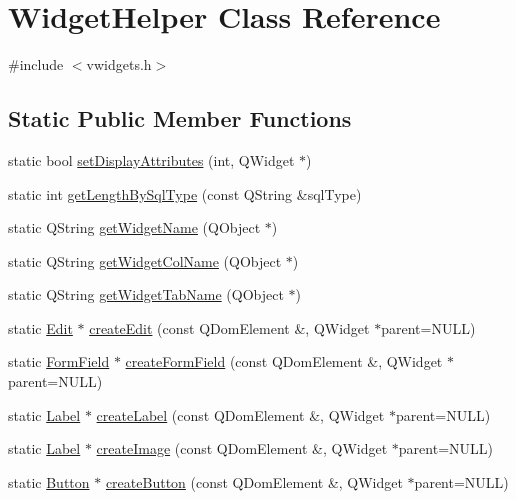 \hypertarget{classWidgetHelper}{
\section{WidgetHelper Class Reference}
\label{classWidgetHelper}
}


{\ttfamily \#include $<$vwidgets.h$>$}

\subsection*{Static Public Member Functions}
\begin{DoxyCompactItemize}
\item 
static bool \hyperlink{classWidgetHelper_aabfcae96d26b2f06c6b54415fafd126a}{setDisplayAttributes} (int, QWidget $\ast$)
\item 
static int \hyperlink{classWidgetHelper_a44924edd75dd3550e891d36e4239c3b5}{getLengthBySqlType} (const QString \&sqlType)
\item 
static QString \hyperlink{classWidgetHelper_ab262e7771ed7559e29f96b84f30fa060}{getWidgetName} (QObject $\ast$)
\item 
static QString \hyperlink{classWidgetHelper_a5b84bc03a940b50ce9adbf8aa743d050}{getWidgetColName} (QObject $\ast$)
\item 
static QString \hyperlink{classWidgetHelper_ac17838da3e6d0857231e428c0a24b18d}{getWidgetTabName} (QObject $\ast$)
\item 
static \hyperlink{classEdit}{Edit} $\ast$ \hyperlink{classWidgetHelper_ae1c1eafb6a151ca2fffd8ad97e2ce0e2}{createEdit} (const QDomElement \&, QWidget $\ast$parent=NULL)
\item 
static \hyperlink{classFormField}{FormField} $\ast$ \hyperlink{classWidgetHelper_a5944782c8e36ae4d657129e519373d49}{createFormField} (const QDomElement \&, QWidget $\ast$parent=NULL)
\item 
static \hyperlink{classLabel}{Label} $\ast$ \hyperlink{classWidgetHelper_a881cf0f58d99160a2bb26952dcd0ef83}{createLabel} (const QDomElement \&, QWidget $\ast$parent=NULL)
\item 
static \hyperlink{classLabel}{Label} $\ast$ \hyperlink{classWidgetHelper_a368ade1be02a16b36f98b6dc56fbad68}{createImage} (const QDomElement \&, QWidget $\ast$parent=NULL)
\item 
static \hyperlink{classButton}{Button} $\ast$ \hyperlink{classWidgetHelper_abd0bc4a027c1a4fbd986e467b2eb7fe4}{createButton} (const QDomElement \&, QWidget $\ast$parent=NULL)

\end{DoxyCompactItemize}

